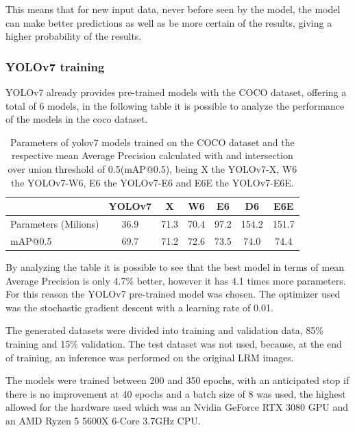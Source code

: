 This means that for new input data, never before seen by the model, the model can make better predictions as well as be more certain of the results, giving a higher probability of the results.



\subsubsection{YOLOv7 training}


YOLOv7 already provides pre-trained models with the COCO dataset, offering a total of 6 models, in the following table it is possible to analyze the performance of the models in the coco dataset.

\begin{table}[H]
\centering
\begin{tabular}{|p{2cm}| c |c |c |c |c |c|} 
 \hline
  &  YOLOv7 & X & W6 & E6 & D6 & E6E \\ [0.2ex] 
 \hline\hline
 Parameters (Milions) & 36.9 & 71.3 & 70.4 & 97.2 & 154.2 & 151.7\\ 
 mAP@0.5 & 69.7 & 71.2 & 72.6 & 73.5 & 74.0 & 74.4 \\[1ex] 
 \hline
\end{tabular}
\caption{Parameters of yolov7 models trained on the COCO dataset and the respective mean Average Precision calculated with and intersection over union threshold of 0.5(mAP@0.5), being X the YOLOv7-X, W6 the YOLOv7-W6, E6 the YOLOv7-E6 and E6E the YOLOv7-E6E.}
\end{table}

By analyzing the table it is possible to see that the best model in terms of mean Average Precision is only 4.7\% better, however it has 4.1 times more parameters. For this reason the YOLOv7 pre-trained model was chosen. The optimizer used was the stochastic gradient descent with a learning rate of 0.01.

The generated datasets were divided into training and validation data, 85\% training and 15\% validation. The test dataset was not used, because, at the end of training, an inference was performed on the original LRM images.

The models were trained between 200 and 350 epochs, with an anticipated stop if there is no improvement at 40 epochs and a batch size of 8 was used, the highest allowed for the hardware used which was an Nvidia GeForce RTX 3080 GPU and an AMD Ryzen 5 5600X 6-Core 3.7GHz CPU.

